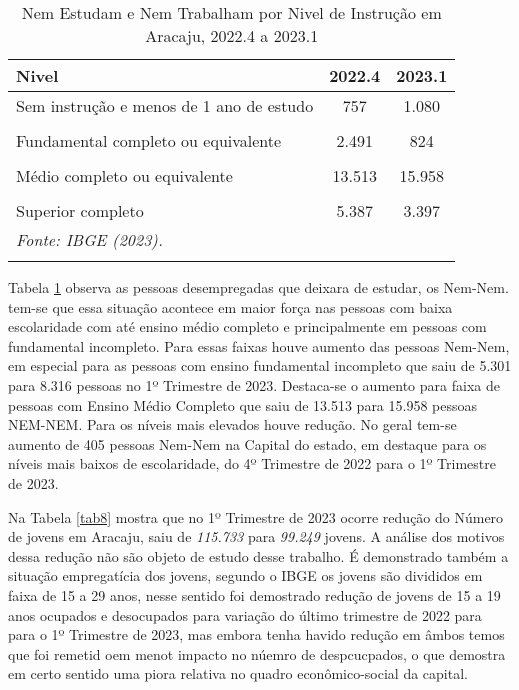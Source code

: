 \documentclass[preprint, 3p,
authoryear]{elsarticle} %
\begin{document}
\begin{longtable}[t]{lcc}
\caption{\label{tab:tab7}\label{tab7}Nem Estudam e Nem Trabalham por Nivel de Instrução em Aracaju, 2022.4 a 2023.1}\\
\toprule
Nivel & 2022.4 & 2023.1\\
\midrule
Sem instrução e menos de 1 ano de estudo & 757 & 1.080\\
\cellcolor[HTML]{DCDCDC}{Fundamental incompleto ou equivalente} & \cellcolor[HTML]{DCDCDC}{5.301} & \cellcolor[HTML]{DCDCDC}{8.316}\\
Fundamental completo ou equivalente & 2.491 & 824\\
\cellcolor[HTML]{DCDCDC}{Médio incompleto ou equivalente} & \cellcolor[HTML]{DCDCDC}{4.625} & \cellcolor[HTML]{DCDCDC}{2.937}\\
Médio completo ou equivalente & 13.513 & 15.958\\
\addlinespace
\cellcolor[HTML]{DCDCDC}{Superior incompleto ou equivalente} & \cellcolor[HTML]{DCDCDC}{1.827} & \cellcolor[HTML]{DCDCDC}{1.794}\\
Superior completo & 5.387 & 3.397\\
\bottomrule
\multicolumn{3}{l}{\rule{0pt}{1em}\textit{Fonte: IBGE (2023).}}\\
\multicolumn{3}{l}{\rule{0pt}{1em}}\\
\end{longtable}
\endgroup{}

Tabela \ref{tab7} observa as pessoas desempregadas que deixara de
estudar, os Nem-Nem. tem-se que essa situação acontece em maior força
nas pessoas com baixa escolaridade com até ensino médio completo e
principalmente em pessoas com fundamental incompleto. Para essas faixas
houve aumento das pessoas Nem-Nem, em especial para as pessoas com
ensino fundamental incompleto que saiu de 5.301 para 8.316 pessoas no 1º
Trimestre de 2023. Destaca-se o aumento para faixa de pessoas com Ensino
Médio Completo que saiu de 13.513 para 15.958 pessoas NEM-NEM. Para os
níveis mais elevados houve redução. No geral tem-se aumento de 405
pessoas Nem-Nem na Capital do estado, em destaque para os níveis mais
baixos de escolaridade, do 4º Trimestre de 2022 para o 1º Trimestre de
2023.

Na Tabela \ref{tab8} mostra que no 1º Trimestre de 2023 ocorre redução
do Número de jovens em Aracaju, saiu de \emph{115.733} para
\emph{99.249} jovens. A análise dos motivos dessa redução não são objeto
de estudo desse trabalho. É demonstrado também a situação empregatícia
dos jovens, segundo o IBGE \citeyearpar{ibge2023} os jovens são
divididos em faixa de 15 a 29 anos, nesse sentido foi demostrado redução
de jovens de 15 a 19 anos ocupados e desocupados para variação do último
trimestre de 2022 para para o 1º Trimestre de 2023, mas embora tenha
havido redução em âmbos temos que foi remetid oem menot impacto no
núemro de despcucpados, o que demostra em certo sentido uma piora
relativa no quadro econômico-social da capital.
\end{document}
